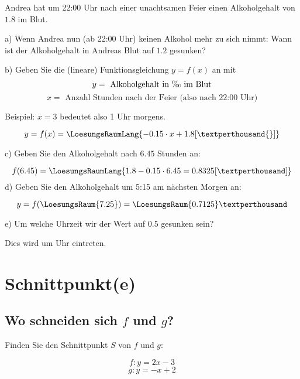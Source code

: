 Andrea hat um 22:00 Uhr nach einer unachtsamen Feier einen
Alkoholgehalt von $1.8$\textperthousand{} im Blut.

a) Wenn Andrea nun (ab 22:00 Uhr) keinen Alkohol mehr zu sich nimmt:
Wann ist der Alkoholgehalt in Andreas Blut auf $1.2$\textperthousand{}
gesunken?


b) Geben Sie die (lineare) Funktionsgleichung $y=f(x)$ an mit
$$y = \text{ Alkoholgehalt in \textperthousand{} im Blut}$$
$$x = \text{ Anzahl Stunden nach der Feier (also nach 22:00 Uhr)}$$

Beispiel: $x=3$ bedeutet also 1 Uhr morgens.

$$y = f(x) = \LoesungsRaumLang{-0.15\cdot{}x + 1.8 [\text{\textperthousand{}}]}$$

c) Geben Sie den Alkoholgehalt nach $6.45$ Stunden an:

$$f(6.45) = \LoesungsRaumLang{1.8-0.15\cdot{}6.45 = 0.8325
[\text{\textperthousand}]}$$
\TNTeop{}
d) Geben Sie den Alkoholgehalt um 5:15 am nächsten Morgen an:

$$y = f(\LoesungsRaum{7.25}) = \LoesungsRaum{0.7125}\textperthousand$$


e) Um welche Uhrzeit wir der Wert auf $0.5$\textperthousand{} gesunken
sein?

\vspace{5mm}
Dies wird um  Uhr eintreten.

\section{Schnittpunkt(e)}
\subsection{Wo schneiden sich $f$ und $g$?}
Finden Sie den Schnittpunkt $S$ von $f$ und $g$:

$$f: y= 2x-3$$
$$g: y=-x+2$$


